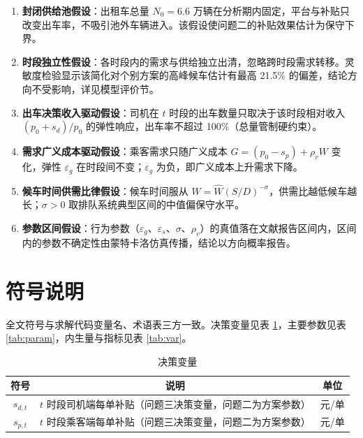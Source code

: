 \documentclass[12pt,a4paper]{ctexart}
\begin{document}
\begin{enumerate}[label=\arabic*.~, leftmargin=2.5em, itemsep=2pt]
\item \textbf{封闭供给池假设}：出租车总量 $N_0=6.6$ 万辆在分析期内固定，平台与补贴只改变出车率，不吸引池外车辆进入。该假设使问题二的补贴效果估计为保守下界。
\item \textbf{时段独立性假设}：各时段内的需求与供给独立出清，忽略跨时段需求转移。灵敏度检验显示该简化对个别方案的高峰候车估计有最高 21.5\% 的偏差，结论方向不受影响，详见模型评价节。
\item \textbf{出车决策收入驱动假设}：司机在 $t$ 时段的出车数量只取决于该时段相对收入 $(p_0+s_d)/p_0$ 的弹性响应，出车率不超过 100\%（总量管制硬约束）。
\item \textbf{需求广义成本驱动假设}：乘客需求只随广义成本 $G=(p_0-s_p)+\rho_v W$ 变化，弹性 $\varepsilon_g$ 在时段间不变；$\varepsilon_g$ 为负，即广义成本上升需求下降。
\item \textbf{候车时间供需比律假设}：候车时间服从 $W=\hat{W}(S/D)^{-\sigma}$，供需比越低候车越长；$\sigma>0$ 取排队系统典型区间的中值偏保守水平。
\item \textbf{参数区间假设}：行为参数（$\varepsilon_g$、$\varepsilon_s$、$\sigma$、$\rho_v$）的真值落在文献报告区间内，区间内的参数不确定性由蒙特卡洛仿真传播，结论以方向概率报告。
\end{enumerate}

\section{符号说明}

全文符号与求解代码变量名、术语表三方一致。决策变量见表 \ref{tab:dv}，主要参数见表 \ref{tab:param}，内生量与指标见表 \ref{tab:var}。

\begin{table}[H]
\centering
\caption{决策变量}
\label{tab:dv}
\begin{tabular}{c c c}
\toprule
符号 & 说明 & 单位 \\
\midrule
$s_{d,t}$ & $t$ 时段司机端每单补贴（问题三决策变量，问题二为方案参数） & 元/单 \\
$s_{p,t}$ & $t$ 时段乘客端每单补贴（问题三决策变量，问题二为方案参数） & 元/单 \\
\bottomrule
\end{tabular}
\end{table}
\end{document}
